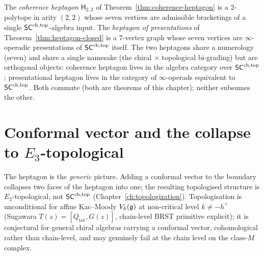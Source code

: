 \begin{remark}
\label{rem:heptagon-vs-heptagon-of-presentations}%
The \emph{coherence heptagon} $\mathsf{H}_{2,2}$ of
Theorem~\ref{thm:coherence-heptagon} is a $2$-polytope in arity
$(2, 2)$ whose seven vertices are admissible bracketings of a
single $\mathsf{SC}^{\mathrm{ch},\mathrm{top}}$-algebra input. The
\emph{heptagon of presentations} of
Theorem~\ref{thm:heptagon-closed} is a $7$-vertex graph whose
seven vertices are $\infty$-operadic presentations of
$\mathsf{SC}^{\mathrm{ch},\mathrm{top}}$ itself. The two heptagons share a numerology (seven)
and share a single namesake (the chiral $\times$ topological
bi-grading) but are orthogonal objects: coherence heptagon
lives in the algebra category over $\mathsf{SC}^{\mathrm{ch},\mathrm{top}}$;
presentational heptagon lives in the category of
$\infty$-operads equivalent to $\mathsf{SC}^{\mathrm{ch},\mathrm{top}}$. Both commute (both
are theorems of this chapter); neither subsumes the other.
\end{remark}
\section{Conformal vector and the collapse to $E_3$-topological}
\label{sec:heptagon-conformal-vector}

The heptagon is the \emph{generic} picture. Adding a conformal vector
to the boundary collapses two faces of the heptagon into one; the
resulting topologised structure is $E_3$-topological, not $\mathsf{SC}^{\mathrm{ch},\mathrm{top}}$
(Chapter~\ref{ch:topologization}). Topologisation is unconditional
for affine Kac--Moody $V_k(\mathfrak{g})$ at non-critical level $k\neq -h^\vee$
(Sugawara $T(z)=[Q_{\mathrm{tot}},G(z)]$, chain-level BRST
primitive explicit); it is conjectural for general chiral algebras
carrying a conformal vector, cohomological rather than chain-level,
and may genuinely fail at the chain level on the class-$M$ complex.

